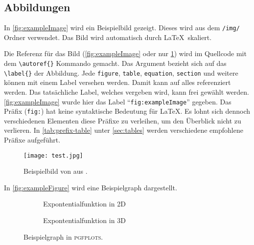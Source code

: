 \subsection{Abbildungen}

In \autoref{fig:exampleImage} wird ein Beispielbild gezeigt.
Dieses wird aus dem \texttt{/img/} Ordner verwendet.
Das Bild wird automatisch durch \LaTeX\ skaliert.

Die Referenz für das Bild (\autoref{fig:exampleImage} oder nur \ref{fig:exampleImage}) wird im Quellcode mit dem \texttt{\textbackslash autoref\{\}} Kommando gemacht.
Das Argument bezieht sich auf das \texttt{\textbackslash label\{\}} der Abbildung.
Jede \texttt{figure}, \texttt{table}, \texttt{equation}, \texttt{section} und weitere können mit einem Label versehen werden.
Damit kann auf alles referenziert werden.
Das tatsächliche Label, welches vergeben wird, kann frei gewählt werden.
\autoref{fig:exampleImage} wurde hier das Label \enquote{\texttt{fig:exampleImage}} gegeben.
Das Präfix (\texttt{fig:}) hat keine syntaktische Bedeutung für \LaTeX.
Es lohnt sich dennoch verschiedenen Elementen diese Präfixe zu verleihen, um den Überblick nicht zu verlieren.
In \autoref{tab:prefix-table} unter \autoref{sec:tables} werden verschiedene empfohlene Präfixe aufgeführt.

\begin{figure}[ht]
    \centering
    \texttt{[image: test.jpg]}
    \caption[Beispielbild]{Beispielbild von \citeauthor{exampleImage} aus \autocite{exampleImage}.}
    \label{fig:exampleImage}
\end{figure}

In \autoref{fig:exampleFigure} wird eine Beispielgraph dargestellt.

\begin{figure}[ht]
    \centering
    \begin{subfigure}{0.45\textwidth}
        \caption{Expontentialfunktion in 2D}
        \label{fig:2d-exp}
    \end{subfigure}
    \begin{subfigure}{0.45\textwidth}
        \caption{Expontentialfunktion in 3D}
        \label{fig:3d-exp}
    \end{subfigure}
    \caption[Beispielgraph]{Beispielgraph in \textsc{pgfplots}.}
    \label{fig:exampleFigure}
\end{figure}

